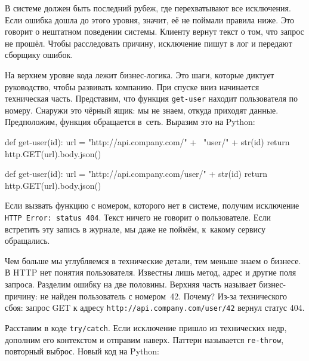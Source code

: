 В системе должен быть последний рубеж, где перехватывают все исключения. Если
ошибка дошла до этого уровня, значит, её не поймали правила ниже. Это говорит о
нештатном поведении системы. Клиенту вернут текст о том, что запрос не
прошёл. Чтобы расследовать причину, исключение пишут в лог и передают сборщику
ошибок.

На верхнем уровне кода лежит бизнес-логика. Это шаги, которые диктует
руководство, чтобы развивать компанию. При спуске вниз начинается техническая
часть. Представим, что функция \verb|get-user| находит пользователя по
номеру. Снаружи это чёрный ящик: мы не знаем, откуда приходят
данные. Предположим, функция обращается в~сеть. Выразим это на Python:

\ifx\DEVICETYPE\MOBILE

\begin{english}
  \begin{python}
def get-user(id):
  url = "http://api.company.com/" + \
        "user/" + str(id)
  return http.GET(url).body.json()
  \end{python}
\end{english}

\else

\begin{english}
  \begin{python}
def get-user(id):
  url = "http://api.company.com/user/" + str(id)
  return http.GET(url).body.json()
  \end{python}
\end{english}

\fi

Если вызвать функцию с номером, которого нет в системе, получим исключение
\verb|HTTP Error: status 404|. Текст ничего не говорит о пользователе. Если
встретить эту запись в журнале, мы даже не поймём, к~какому сервису обращались.

Чем больше мы углубляемся в технические детали, тем меньше знаем о бизнесе. В
HTTP нет понятия пользователя. Известны лишь метод, адрес и другие поля
запроса. Разделим ошибку на две половины. Верхняя часть называет бизнес-причину:
не найден пользователь с номером~42. Почему? Из-за технического сбоя: запрос GET
к адресу \verb|http://api.company.com/user/42| вернул статус 404.

Расставим в коде \verb|try/catch|. Если исключение пришло из технических недр,
дополним его контекстом и отправим наверх. Паттерн называется \verb|re-throw|,
повторный выброс. Новый код на Python:

